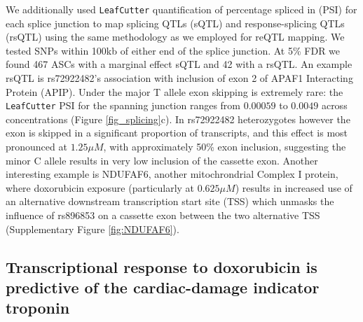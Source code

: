 \documentclass{article}
\begin{document}
{We additionally used \texttt{LeafCutter} quantification of percentage spliced in (PSI) for each splice junction to map splicing QTLs (sQTL) and response-splicing QTLs (rsQTL) using the same methodology as we employed for reQTL mapping. We tested SNPs within 100kb of either end of the splice junction. At 5\% FDR we found 467 ASCs with a marginal effect sQTL and 42 with a rsQTL. An example rsQTL is rs72922482's association with inclusion of exon 2 of APAF1 Interacting Protein (APIP). Under the major T allele exon skipping is extremely rare: the \texttt{LeafCutter} PSI for the spanning junction ranges from $0.00059$ to $0.0049$ across concentrations (Figure \ref{fig_splicing}c). In rs72922482 heterozygotes however the exon is skipped in a significant proportion of transcripts, and this effect is most pronounced at $1.25 \mu M$, with approximately 50\% exon inclusion, suggesting the minor C allele results in very low inclusion of the cassette exon. Another interesting example is NDUFAF6, another mitochrondrial Complex I protein, where doxorubicin exposure (particularly at $0.625 \mu M$) results in increased use of an alternative downstream transcription start site (TSS) which unmasks the influence of rs896853 on a cassette exon between the two alternative TSS (Supplementary Figure \ref{fig:NDUFAF6}).

\subsection*{Transcriptional response to doxorubicin is predictive of the cardiac-damage indicator troponin}


}
\end{document}
